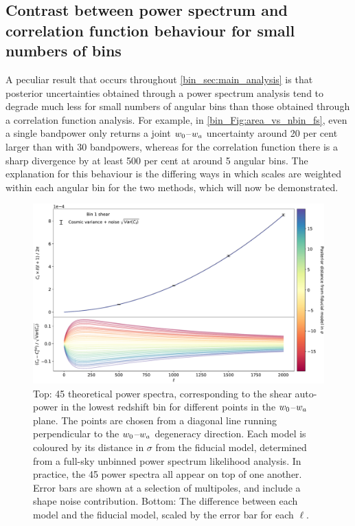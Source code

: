 \subsection{Contrast between power spectrum and correlation function behaviour for small numbers of bins}
\label{bin_sec:low_nbin}

A peculiar result that occurs throughout \autoref{bin_sec:main_analysis} is that posterior uncertainties obtained through a power spectrum analysis tend to degrade much less for small numbers of angular bins than those obtained through a correlation function analysis. For example, in \autoref{bin_Fig:area_vs_nbin_fs}, even a single bandpower only returns a joint $w_0$--$w_a$ uncertainty around 20 per cent larger than with 30 bandpowers, whereas for the correlation function there is a sharp divergence by at least 500 per cent at around 5 angular bins. The explanation for this behaviour is the differing ways in which scales are weighted within each angular bin for the two methods, which will now be demonstrated.

\begin{figure}[t]
\includegraphics[width=\textwidth]{cl_perl}
\caption{Top: 45 theoretical power spectra, corresponding to the shear auto-power in the lowest redshift bin for different points in the $w_0$--$w_a$ plane. The points are chosen from a diagonal line running perpendicular to the $w_0$--$w_a$ degeneracy direction. Each model is coloured by its distance in $\sigma$ from the fiducial model, determined from a full-sky unbinned power spectrum likelihood analysis. In practice, the 45 power spectra all appear on top of one another. Error bars are shown at a selection of multipoles, and include a shape noise contribution. Bottom: The difference between each model and the fiducial model, scaled by the error bar for each $\ell$.}
\label{bin_Fig:cl_perl}
\end{figure}

